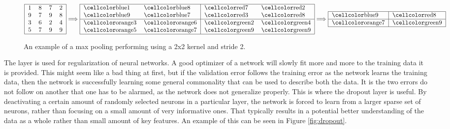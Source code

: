 \begin{description}
        \begin{figure}
        \centering
        \begin{equation}
            \begin{tabular}{|llll|}
            \hline
            1 & 8 & 7 & 2 \\
            9 & 7 & 9 & 8 \\
            3 & 6 & 2 & 4 \\
            5 & 7 & 9 & 9 \\\hline
            \end{tabular}
                \Longrightarrow
            \begin{tabular}{|ll|ll|}
            \hline
            \cc{blue}1 & \cc{blue}8 & \cc{red}7 & \cc{red}2 \\
            \cc{blue}9 & \cc{blue}7 & \cc{red}3 & \cc{red}8 \\ \hline
            \cc{orange}3 & \cc{orange}6 & \cc{green}2 & \cc{green}4 \\
            \cc{orange}5 & \cc{orange}7 & \cc{green}9 & \cc{green}9\\
            \hline
            \end{tabular}
                \Longrightarrow
            \begin{tabular}{|l|l|}
            \hline
            \cc{blue}9 & \cc{red}8\\\hline
            \cc{orange}7 & \cc{green}9\\
            \hline
            \end{tabular}
        \end{equation}
        \caption{An example of a max pooling performing using a 2x2 kernel and
            stride 2.}
        \label{fig:max_pool}
        \end{figure}


    \item[Dropout Layer:]

        The layer is used for regularization of neural networks. A good
        optimizer of a network will slowly fit more and more to the training
        data it is provided. This might seem like a bad thing at first, but if
        the validation error follows the training error as the network learns
        the training data, then the network is successfully learning some
        general commonality that can be used to describe both the data. It is
        the two errors do not follow on another that one has to be alarmed, as
        the network does not generalize properly. This is where the dropout
        layer is useful. By deactivating a certain amount of randomly selected
        neurons in a particular layer, the network is forced to learn from a
        larger sparse set of neurons, rather than focusing on a small amount
        of very informative ones. That typically results in a potential better
        understanding of the data as a whole rather than small amount of key
        features. An example of this can be seen in Figure \ref{fig:dropout}.


\end{description}
